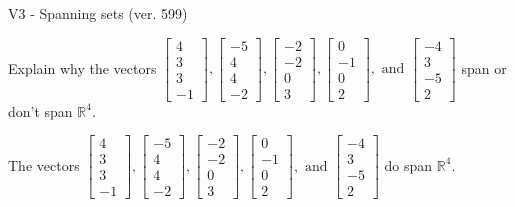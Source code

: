 \begin{exercise}
  \begin{exerciseTitle}V3 - Spanning sets (ver. 599)\end{exerciseTitle}
  \begin{exerciseStatement}
    Explain why the vectors \(\left[\begin{array}{r}
4 \\
3 \\
3 \\
-1
\end{array}\right] , \left[\begin{array}{r}
-5 \\
4 \\
4 \\
-2
\end{array}\right] , \left[\begin{array}{r}
-2 \\
-2 \\
0 \\
3
\end{array}\right] , \left[\begin{array}{r}
0 \\
-1 \\
0 \\
2
\end{array}\right] , \text{ and } \left[\begin{array}{r}
-4 \\
3 \\
-5 \\
2
\end{array}\right]\) span or don't span \(\mathbb{R}^4\). 
	


  \end{exerciseStatement}
  \begin{exerciseAnswer}
   The vectors \(\left[\begin{array}{r}
4 \\
3 \\
3 \\
-1
\end{array}\right] , \left[\begin{array}{r}
-5 \\
4 \\
4 \\
-2
\end{array}\right] , \left[\begin{array}{r}
-2 \\
-2 \\
0 \\
3
\end{array}\right] , \left[\begin{array}{r}
0 \\
-1 \\
0 \\
2
\end{array}\right] , \text{ and } \left[\begin{array}{r}
-4 \\
3 \\
-5 \\
2
\end{array}\right]\) 
  	 do  
	span \(\mathbb{R}^4\).
  



\end{exerciseAnswer}
\end{exercise}

